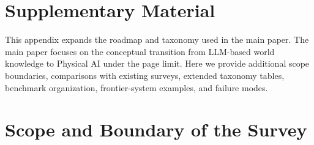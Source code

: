 \section{Supplementary Material}
\label{app:supplementary}

This appendix expands the roadmap and taxonomy used in the main paper. 
The main paper focuses on the conceptual transition from LLM-based world knowledge to Physical AI under the page limit. 
Here we provide additional scope boundaries, comparisons with existing surveys, extended taxonomy tables, benchmark organization, frontier-system examples, and failure modes.

\section{Scope and Boundary of the Survey}
\label{app:scope}

